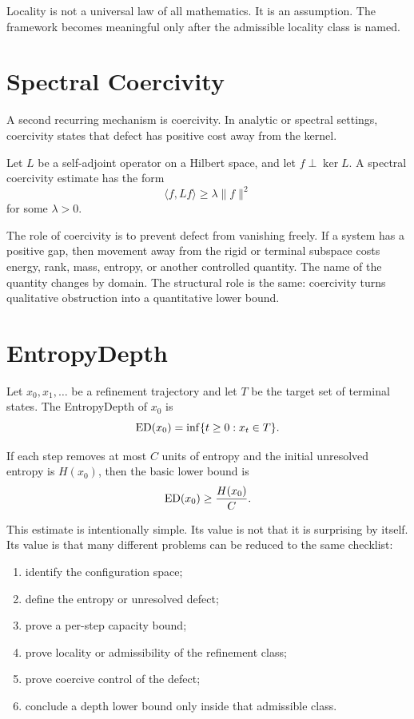 Locality is not a universal law of all mathematics. It is an assumption. The
framework becomes meaningful only after the admissible locality class is named.

\section{Spectral Coercivity}

A second recurring mechanism is coercivity. In analytic or spectral settings,
coercivity states that defect has positive cost away from the kernel.

\begin{definition}
Let \(L\) be a self-adjoint operator on a Hilbert space, and let
\(f\perp \ker L\). A spectral coercivity estimate has the form
\[
\langle f,Lf\rangle \ge \lambda \|f\|^2
\]
for some \(\lambda>0\).
\end{definition}

The role of coercivity is to prevent defect from vanishing freely. If a
system has a positive gap, then movement away from the rigid or terminal
subspace costs energy, rank, mass, entropy, or another controlled quantity.
The name of the quantity changes by domain. The structural role is the same:
coercivity turns qualitative obstruction into a quantitative lower bound.

\section{EntropyDepth}

\begin{definition}[EntropyDepth]
Let \(x_0,x_1,\ldots\) be a refinement trajectory and let \(T\) be the target
set of terminal states. The EntropyDepth of \(x_0\) is
\[
\mathrm{ED}(x_0)=\inf\{t\ge 0:x_t\in T\}.
\]
\end{definition}

If each step removes at most \(C\) units of entropy and the initial unresolved
entropy is \(H(x_0)\), then the basic lower bound is
\[
\mathrm{ED}(x_0)\ge \frac{H(x_0)}{C}.
\]

This estimate is intentionally simple. Its value is not that it is surprising
by itself. Its value is that many different problems can be reduced to the
same checklist:

\begin{enumerate}
\item identify the configuration space;
\item define the entropy or unresolved defect;
\item prove a per-step capacity bound;
\item prove locality or admissibility of the refinement class;
\item prove coercive control of the defect;
\item conclude a depth lower bound only inside that admissible class.
\end{enumerate}

